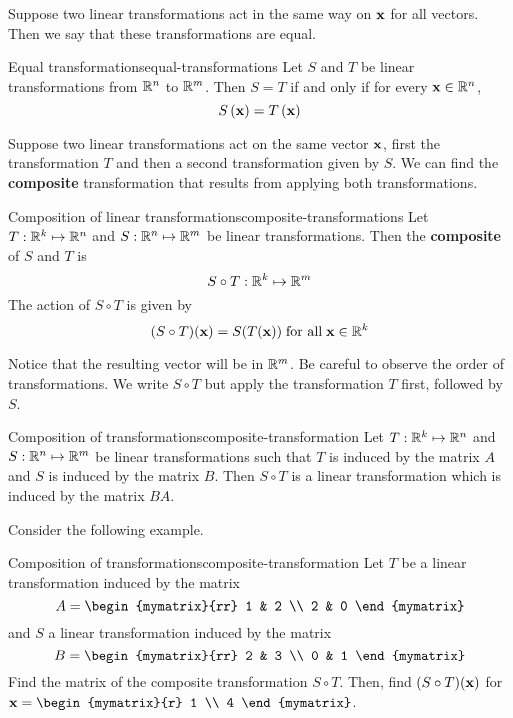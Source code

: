Suppose two linear transformations act in the same way on $\mbox{\bf x}$ for all vectors. Then we say that these transformations are equal.

\begin{definition}{Equal transformations}{equal-transformations}
Let $S$ and $T$ be linear transformations from $\mathbb{R}^n$ to $\mathbb{R}^m$. Then $S = T$ if and only if for every $\mbox{\bf x} \in \mathbb{R}^n$, 
\[
S \left(\mbox{\bf x} \right) = T \left(\mbox{\bf x} \right)
\]
\end{definition}

Suppose two linear transformations act on the same vector $\mbox{\bf x}$, first the transformation $T$ and then a second transformation given by $S$. We can find the \textbf{composite} transformation that results from applying both transformations.

\begin{definition}{Composition of linear transformations}{composite-transformations}
Let $T: \mathbb{R}^k \mapsto \mathbb{R}^n$ and $S: \mathbb{R}^n \mapsto \mathbb{R}^m$ be linear transformations. Then the \textbf{composite} of $S$ and $T$ is 
\[
S \circ T: \mathbb{R}^k \mapsto \mathbb{R}^m
\]
The action of $S \circ T$ is given by 
\[
(S \circ T) (\mbox{\bf x}) = S(T(\mbox{\bf x})) \; \mbox{for all} \; \mbox{\bf x} \in \mathbb{R}^k
\]
\end{definition}

Notice that the resulting vector will be in $\mathbb{R}^m$. Be careful to observe the order of transformations. We write $S \circ T$ but apply the transformation $T$ first, followed by $S$. 

\begin{theorem}{Composition of transformations}{composite-transformation}
Let $T: \mathbb{R}^k \mapsto \mathbb{R}^n$ and $S: \mathbb{R}^n \mapsto \mathbb{R}^m$ be linear transformations such that $T$ is induced by the matrix $A$ and $S$ is induced by the matrix $B$. Then $S \circ T$ is a linear transformation which is induced by the matrix $BA$.
\end{theorem}

Consider the following example. 

\begin{example}{Composition of transformations}{composite-transformation}
Let $T$ be a linear transformation induced by the matrix 
\[
A = 
\begin{mymatrix}{rr}
1 & 2 \\
2 & 0 
\end{mymatrix}
\]
and $S$ a linear transformation induced by the matrix
\[
B = 
\begin{mymatrix}{rr}
2 & 3 \\
0 & 1
\end{mymatrix}
\]
Find the matrix of the composite transformation $S \circ T$. Then, find $(S \circ T)(\mbox{\bf x})$ for $\vect{x} = \begin{mymatrix}{r}
1 \\
4 
\end{mymatrix}$.
\end{example}

